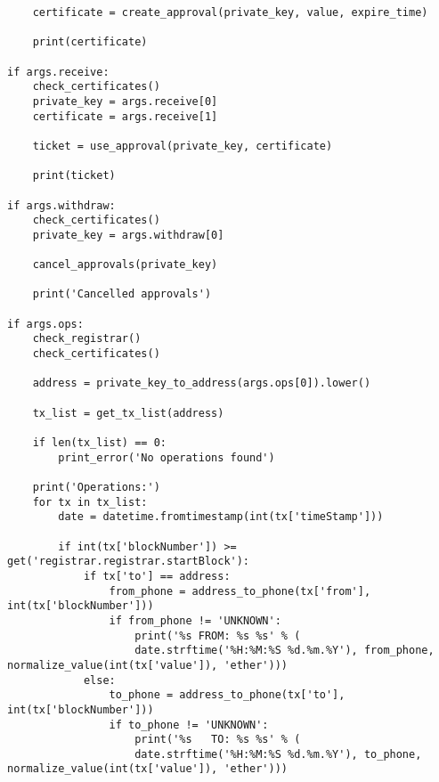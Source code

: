 \begin{verbatim}
    certificate = create_approval(private_key, value, expire_time)

    print(certificate)

if args.receive:
    check_certificates()
    private_key = args.receive[0]
    certificate = args.receive[1]

    ticket = use_approval(private_key, certificate)

    print(ticket)

if args.withdraw:
    check_certificates()
    private_key = args.withdraw[0]

    cancel_approvals(private_key)

    print('Cancelled approvals')

if args.ops:
    check_registrar()
    check_certificates()

    address = private_key_to_address(args.ops[0]).lower()

    tx_list = get_tx_list(address)

    if len(tx_list) == 0:
        print_error('No operations found')

    print('Operations:')
    for tx in tx_list:
        date = datetime.fromtimestamp(int(tx['timeStamp']))

        if int(tx['blockNumber']) >= get('registrar.registrar.startBlock'):
            if tx['to'] == address:
                from_phone = address_to_phone(tx['from'], int(tx['blockNumber']))
                if from_phone != 'UNKNOWN':
                    print('%s FROM: %s %s' % (
                    date.strftime('%H:%M:%S %d.%m.%Y'), from_phone, normalize_value(int(tx['value']), 'ether')))
            else:
                to_phone = address_to_phone(tx['to'], int(tx['blockNumber']))
                if to_phone != 'UNKNOWN':
                    print('%s   TO: %s %s' % (
                    date.strftime('%H:%M:%S %d.%m.%Y'), to_phone, normalize_value(int(tx['value']), 'ether')))
\end{verbatim}

